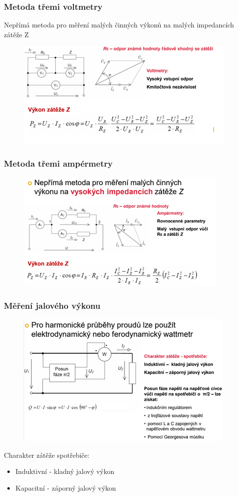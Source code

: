 \subsubsection*{Metoda třemi voltmetry}
Nepřímá metoda pro měření malých činných výkonů na malých impedancích zátěže Z
\begin{figure}[H]
    \includegraphics*[scale = 1.5]{images/voltrmetry3.png}
\end{figure}

\subsubsection*{Metoda třemi ampérmetry}
\begin{figure}[H]
    \includegraphics*[scale = 1.5]{images/ampermetry3.png}
\end{figure}

\subsubsection*{Měření jalového výkonu}
\begin{figure}[H]
    \includegraphics*[scale = 1.3]{images/jalovec.png}
\end{figure}
Charakter zátěže spotřebiče:
\begin{itemize}
    \item Induktivní - kladný jalový výkon
    \item Kapacitní - záporný jalový výkon
\end{itemize}


